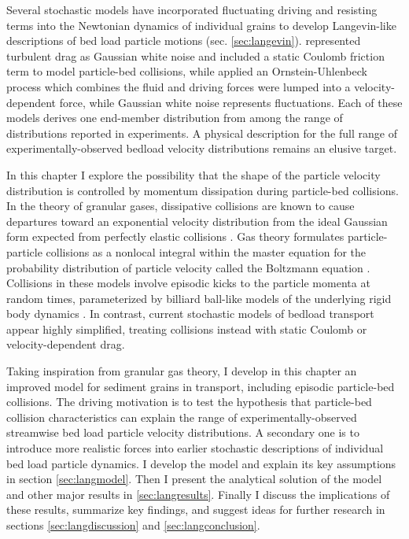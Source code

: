 Several stochastic models have incorporated fluctuating driving and resisting terms into the Newtonian dynamics of individual grains to develop Langevin-like descriptions of bed load particle motions (sec. \ref{sec:langevin}). \citet{Fan2014} represented turbulent drag as Gaussian white noise and included a static Coulomb friction term to model particle-bed collisions, while \citet{Ancey2014} applied an Ornstein-Uhlenbeck process which combines the fluid and driving forces were lumped into a velocity-dependent force, while Gaussian white noise represents fluctuations.
Each of these models derives one end-member distribution from among the range of distributions reported in experiments.
A physical description for the full range of experimentally-observed bedload velocity distributions remains an elusive target.

In this chapter I explore the possibility that the shape of the particle velocity distribution is controlled by momentum dissipation during particle-bed collisions.
In the theory of granular gases, dissipative collisions are known to cause departures toward an exponential velocity distribution from the ideal Gaussian form expected from perfectly elastic collisions \citep{Brilliantov2004}.
Gas theory formulates particle-particle collisions as a nonlocal integral within the master equation for the probability distribution of particle velocity called the Boltzmann equation \citep{Landau1969,Chapman1970}.
Collisions in these models involve episodic kicks to the particle momenta at random times, parameterized by billiard ball-like models of the underlying rigid body dynamics \citep[e.g.][]{Brach1989}.
In contrast, current stochastic models of bedload transport appear highly simplified, treating collisions instead with static Coulomb or velocity-dependent drag.

Taking inspiration from granular gas theory, I develop in this chapter an improved model for sediment grains in transport, including episodic particle-bed collisions.
The driving motivation is to test the hypothesis that particle-bed collision characteristics can explain the range of experimentally-observed streamwise bed load particle velocity distributions.
A secondary one is to introduce more realistic forces into earlier stochastic descriptions of individual bed load particle dynamics. 
I develop the model and explain its key assumptions in section \ref{sec:langmodel}. Then I present the analytical solution of the model and other major results in \ref{sec:langresults}. Finally I discuss the implications of these results, summarize key findings, and suggest ideas for further research in sections \ref{sec:langdiscussion} and \ref{sec:langconclusion}.


